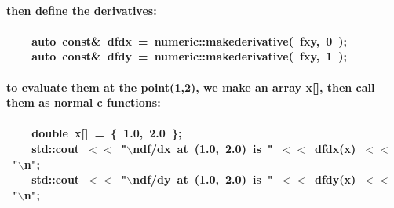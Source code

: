 \documentclass[9pt,onside]{article}
\newcommand{\hlstd}[1]{\textcolor[rgb]{0.2,0,0.4}{#1}}
\newcommand{\hlnum}[1]{\textcolor[rgb]{0.2,0.73,0.02}{#1}}
\newcommand{\hlesc}[1]{\textcolor[rgb]{0.65,0.09,0.38}{#1}}
\newcommand{\hlstr}[1]{\textcolor[rgb]{0.09,0.38,0.65}{#1}}
\newcommand{\hlopt}[1]{\textcolor[rgb]{0.33,0.33,0.33}{#1}}
\newcommand{\hlkwb}[1]{\textcolor[rgb]{0.96,0.55,0.14}{#1}}
\newcommand{\hlkwc}[1]{\textcolor[rgb]{0,0,1}{#1}}
\newcommand{\hlkwd}[1]{\textcolor[rgb]{0.82,0.11,0.93}{#1}}
\begin{document}
\paragraph{then define the derivatives:}
\paragraph{\hlstd{}\hlstd{\ \ \ \ }\hlstd{}\hlkwc{auto\ }\hlstd{}\hlkwb{const}\hlstd{}\hlopt{\&\ }\hlstd{dfdx\ }\hlopt{=\ }\hlstd{numeric}\hlopt{::}\hlstd{}\hlkwd{make\textunderscore derivative}\hlstd{}\hlopt{(\ }\hlstd{fxy}\hlopt{,\ }\hlstd{}\hlnum{0\ }\hlstd{}\hlopt{);}\hspace*{\fill}\\
\hlstd{}\hlstd{\ \ \ \ }\hlstd{}\hlkwc{auto\ }\hlstd{}\hlkwb{const}\hlstd{}\hlopt{\&\ }\hlstd{dfdy\ }\hlopt{=\ }\hlstd{numeric}\hlopt{::}\hlstd{}\hlkwd{make\textunderscore derivative}\hlstd{}\hlopt{(\ }\hlstd{fxy}\hlopt{,\ }\hlstd{}\hlnum{1\ }\hlstd{}\hlopt{);}\hspace*{\fill}\\
}

\paragraph{to evaluate them at the point(1,2), we make an array x[], then call them as normal c functions:}
\paragraph{\hlstd{\ \ \ \ }\hlstd{}\hlkwb{double\ }\hlstd{x}\hlopt{{[}{]}\ =\ \{\ }\hlstd{}\hlnum{1.0}\hlstd{}\hlopt{,\ }\hlstd{}\hlnum{2.0\ }\hlstd{}\hlopt{\};}\hspace*{\fill}\\
\hlstd{}\hlstd{\ \ \ \ }\hlstd{std}\hlopt{::}\hlstd{cout\ }\hlopt{$<$$<$\ }\hlstd{}\hlstr{"}\hlesc{$\backslash$n}\hlstr{df/dx\ at\ (1.0,\ 2.0)\ is\ "}\hlstd{\ }\hlopt{$<$$<$\ }\hlstd{}\hlkwd{dfdx}\hlstd{}\hlopt{(}\hlstd{x}\hlopt{)\ $<$$<$\ }\hlstd{}\hlstr{"}\hlesc{$\backslash$n}\hlstr{"}\hlstd{}\hlopt{;}\hspace*{\fill}\\
\hlstd{}\hlstd{\ \ \ \ }\hlstd{std}\hlopt{::}\hlstd{cout\ }\hlopt{$<$$<$\ }\hlstd{}\hlstr{"}\hlesc{$\backslash$n}\hlstr{df/dy\ at\ (1.0,\ 2.0)\ is\ "}\hlstd{\ }\hlopt{$<$$<$\ }\hlstd{}\hlkwd{dfdy}\hlstd{}\hlopt{(}\hlstd{x}\hlopt{)\ $<$$<$\ }\hlstd{}\hlstr{"}\hlesc{$\backslash$n}\hlstr{"}\hlstd{}\hlopt{;}\hspace*{\fill}\\}
\end{document}
